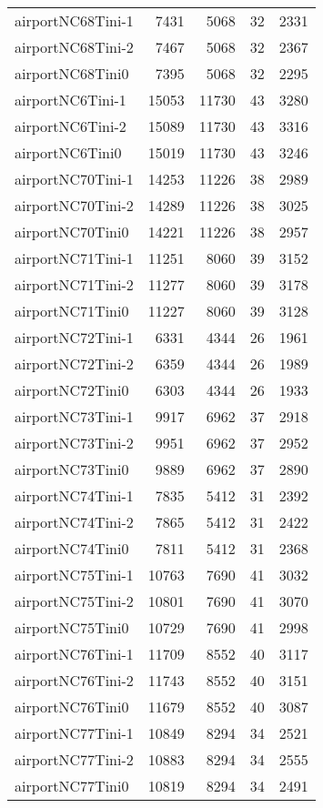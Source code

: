 \begin{tabular}{lrrrr}
airportNC68Tini-1 & 7431 & 5068 & 32 & 2331 \\
airportNC68Tini-2 & 7467 & 5068 & 32 & 2367 \\
airportNC68Tini0 & 7395 & 5068 & 32 & 2295 \\
airportNC6Tini-1 & 15053 & 11730 & 43 & 3280 \\
airportNC6Tini-2 & 15089 & 11730 & 43 & 3316 \\
airportNC6Tini0 & 15019 & 11730 & 43 & 3246 \\
airportNC70Tini-1 & 14253 & 11226 & 38 & 2989 \\
airportNC70Tini-2 & 14289 & 11226 & 38 & 3025 \\
airportNC70Tini0 & 14221 & 11226 & 38 & 2957 \\
airportNC71Tini-1 & 11251 & 8060 & 39 & 3152 \\
airportNC71Tini-2 & 11277 & 8060 & 39 & 3178 \\
airportNC71Tini0 & 11227 & 8060 & 39 & 3128 \\
airportNC72Tini-1 & 6331 & 4344 & 26 & 1961 \\
airportNC72Tini-2 & 6359 & 4344 & 26 & 1989 \\
airportNC72Tini0 & 6303 & 4344 & 26 & 1933 \\
airportNC73Tini-1 & 9917 & 6962 & 37 & 2918 \\
airportNC73Tini-2 & 9951 & 6962 & 37 & 2952 \\
airportNC73Tini0 & 9889 & 6962 & 37 & 2890 \\
airportNC74Tini-1 & 7835 & 5412 & 31 & 2392 \\
airportNC74Tini-2 & 7865 & 5412 & 31 & 2422 \\
airportNC74Tini0 & 7811 & 5412 & 31 & 2368 \\
airportNC75Tini-1 & 10763 & 7690 & 41 & 3032 \\
airportNC75Tini-2 & 10801 & 7690 & 41 & 3070 \\
airportNC75Tini0 & 10729 & 7690 & 41 & 2998 \\
airportNC76Tini-1 & 11709 & 8552 & 40 & 3117 \\
airportNC76Tini-2 & 11743 & 8552 & 40 & 3151 \\
airportNC76Tini0 & 11679 & 8552 & 40 & 3087 \\
airportNC77Tini-1 & 10849 & 8294 & 34 & 2521 \\
airportNC77Tini-2 & 10883 & 8294 & 34 & 2555 \\
airportNC77Tini0 & 10819 & 8294 & 34 & 2491 \\

\end{tabular}
